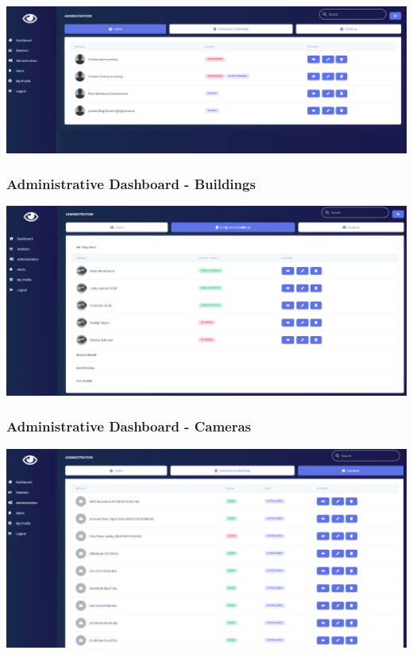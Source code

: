 \documentclass[
  english,
  a4paper,
,tablecaptionabove
]{scrartcl}
\begin{document}
\includegraphics{images/ppm-images/dashboard-users.png} \newpage

\hypertarget{administrative-dashboard---buildings}{%
\subsubsection{Administrative Dashboard -
Buildings}\label{administrative-dashboard---buildings}}

\includegraphics{images/ppm-images/dashboard-buildings.png} \newpage

\hypertarget{administrative-dashboard---cameras}{%
\subsubsection{Administrative Dashboard -
Cameras}\label{administrative-dashboard---cameras}}

\includegraphics{images/ppm-images/dashboard-camera.png} \newpage
\end{document}
